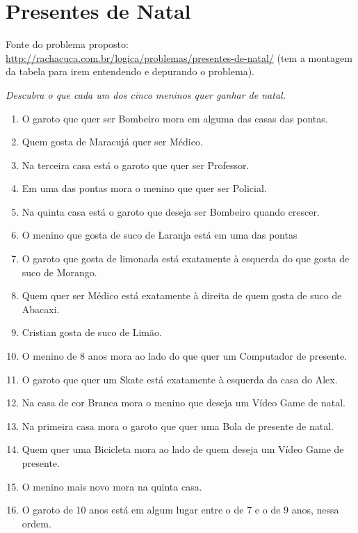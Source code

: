 \documentclass[a4paper,12pt]{article}
\begin{document}
\newpage
\tableofcontents


\newpage
\section{Presentes de Natal}

 Fonte do problema proposto:\\
 \url{http://rachacuca.com.br/logica/problemas/presentes-de-natal/}
 (tem a montagem da tabela para irem entendendo e depurando o problema).\\

{\em 
Descubra o que cada um dos cinco meninos quer ganhar de natal.
\begin{enumerate}
\item	O garoto que quer ser Bombeiro mora em alguma das casas das pontas.
\item	Quem gosta de Maracujá quer ser Médico.
\item	Na terceira casa está o garoto que quer ser Professor.
\item	Em uma das pontas mora o menino que quer ser Policial.
\item	Na quinta casa está o garoto que deseja ser Bombeiro quando crescer.
\item	O menino que gosta de suco de Laranja está em uma das pontas
\item	O garoto que gosta de limonada está exatamente à esquerda do que gosta de suco de Morango.
\item	Quem quer ser Médico está exatamente à direita de quem gosta de suco de Abacaxi.
\item	Cristian gosta de suco de Limão.
\item	O menino de 8 anos mora ao lado do que quer um Computador de presente.
\item	O garoto que quer um Skate está exatamente à esquerda da casa do Alex.
\item	Na casa de cor Branca mora o menino que deseja um Vídeo Game de natal.
\item	Na primeira casa mora o garoto que quer uma Bola de presente de natal.
\item	Quem quer uma Bicicleta mora ao lado de quem deseja um Vídeo Game de presente.
\item	O menino mais novo mora na quinta casa.
\item	O garoto de 10 anos está em algum lugar entre o de 7 e o de 9 anos, nessa ordem.

\end{enumerate}}
\end{document}
